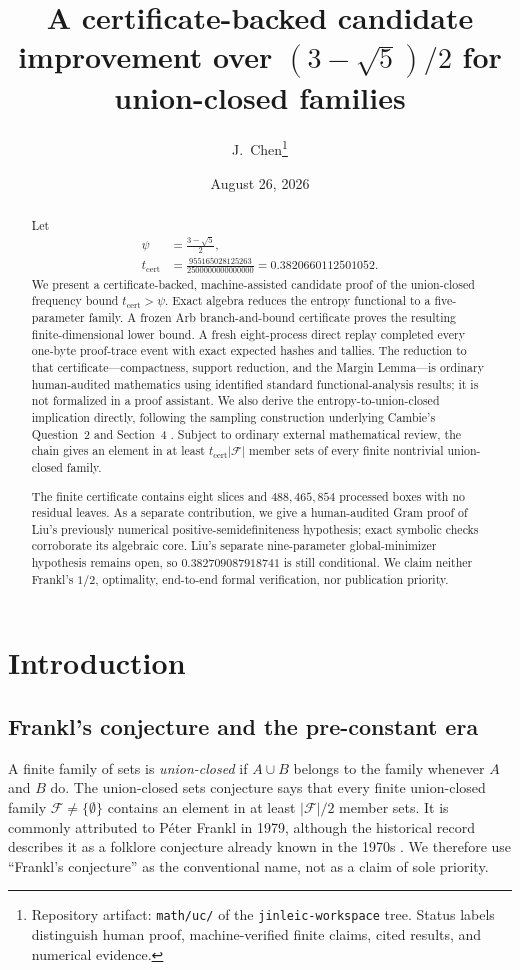 \documentclass[11pt]{article}
\title{A certificate-backed candidate improvement over $(3-\sqrt5)/2$
for union-closed families}
\author{J.\ Chen\thanks{Repository artifact: \texttt{math/uc/} of the
\texttt{jinleic-workspace} tree.  Status labels distinguish human proof,
machine-verified finite claims, cited results, and numerical evidence.}}
\date{August 26, 2026}
\theoremstyle{plain}
\theoremstyle{definition}
\theoremstyle{remark}
\begin{document}
\maketitle

\begin{abstract}
Let
\[
\begin{aligned}
\psi&=\frac{3-\sqrt5}{2},\\
t_{\mathrm{cert}}
&=\frac{955165028125263}{2500000000000000}
=0.3820660112501052.
\end{aligned}
\]
We present a certificate-backed, machine-assisted candidate proof of the
union-closed frequency bound \(t_{\mathrm{cert}}>\psi\).  Exact algebra reduces
the entropy functional to a five-parameter family.  A frozen Arb
branch-and-bound certificate proves the resulting finite-dimensional lower
bound.  A fresh eight-process direct replay completed every one-byte
proof-trace event with exact expected hashes and tallies.
The reduction to that certificate---compactness, support reduction, and the
Margin Lemma---is ordinary human-audited mathematics using identified standard
functional-analysis results; it is not formalized in a proof assistant.  We
also derive the entropy-to-union-closed implication directly, following the
sampling construction underlying Cambie's Question~2 and Section~4
\cite{cambie}.  Subject to ordinary external mathematical review, the chain
gives an element in at least
\(t_{\mathrm{cert}}|\mathcal F|\) member sets of every finite nontrivial
union-closed family.

The finite certificate contains eight slices and \(488{,}465{,}854\) processed
boxes with no residual leaves.  As a separate contribution, we give a
human-audited Gram proof of Liu's previously numerical
positive-semidefiniteness hypothesis; exact symbolic checks corroborate its
algebraic core.  Liu's separate nine-parameter global-minimizer hypothesis
remains open, so \(0.382709087918741\) is still conditional.  We claim neither
Frankl's \(1/2\), optimality, end-to-end formal verification, nor publication
priority.
\end{abstract}

\section{Introduction}

\subsection{Frankl's conjecture and the pre-constant era}
A finite family of sets is \emph{union-closed} if $A\cup B$ belongs to the
family whenever $A$ and $B$ do.  The union-closed sets conjecture says that
every finite union-closed family $\mathcal F\ne\{\emptyset\}$ contains an
element in at least $|\mathcal F|/2$ member sets.  It is commonly attributed to
P\'eter Frankl in 1979, although the historical record describes it as a
folklore conjecture already known in the 1970s
\cite[\S1]{bruhn}.  We therefore use ``Frankl's conjecture'' as the conventional
name, not as a claim of sole priority.
\end{document}
